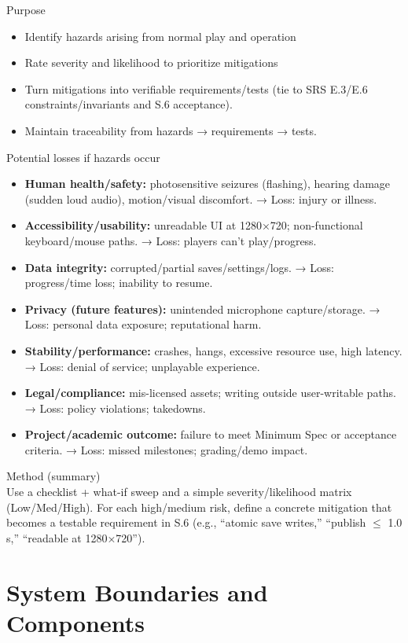\documentclass{article}
\begin{document}
Purpose
\begin{itemize}
\item{Identify hazards arising from normal play and operation}
\item{Rate severity and likelihood to prioritize mitigations}
\item{Turn mitigations into verifiable requirements/tests (tie to SRS E.3/E.6 constraints/invariants and S.6 acceptance).}
\item{Maintain traceability from hazards → requirements → tests.}
\end{itemize}

Potential losses if hazards occur
\begin{itemize}
\item{\textbf{Human health/safety:} photosensitive seizures (flashing), hearing damage (sudden loud audio), motion/visual discomfort. → Loss: injury or illness.}
\item{\textbf{Accessibility/usability:} unreadable UI at 1280×720; non-functional keyboard/mouse paths. → Loss: players can’t play/progress.}
\item{\textbf{Data integrity:} corrupted/partial saves/settings/logs. → Loss: progress/time loss; inability to resume.}
\item{\textbf{Privacy (future features):} unintended microphone capture/storage. → Loss: personal data exposure; reputational harm.}
\item{\textbf{Stability/performance:} crashes, hangs, excessive resource use, high latency. → Loss: denial of service; unplayable experience.}
\item{\textbf{Legal/compliance:} mis-licensed assets; writing outside user-writable paths. → Loss: policy violations; takedowns.}
\item{\textbf{Project/academic outcome:} failure to meet Minimum Spec or acceptance criteria. → Loss: missed milestones; grading/demo impact.}
\end{itemize}

Method (summary)\\
Use a checklist + what-if sweep and a simple severity/likelihood matrix (Low/Med/High). For each high/medium risk, define a concrete mitigation that becomes a testable requirement in S.6 (e.g., “atomic save writes,” “publish $\leq$ 1.0 s,” “readable at 1280×720”). \\

\section{System Boundaries and Components}
\end{document}
